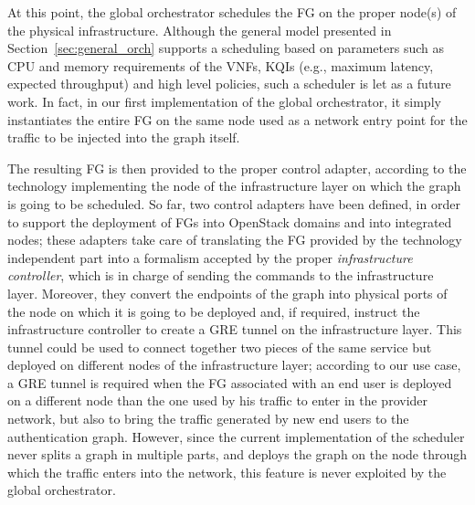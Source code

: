 At this point, the global orchestrator schedules the FG on the proper node(s) of the physical infrastructure.
Although the general model presented in Section~\ref{sec:general_orch} supports a scheduling based on parameters such as CPU and memory requirements of the VNFs, KQIs (e.g., maximum latency, expected throughput) and high level policies, such a scheduler is let as a future work.
In fact, in our first implementation of the global orchestrator, it simply instantiates the entire FG on the same node used as a network entry point for the traffic to be injected into the graph itself.

The resulting FG is then provided to the proper control adapter, according to the technology implementing the node of the infrastructure layer on which the graph is going to be scheduled.
So far, two control adapters have been defined, in order to support the deployment of FGs into OpenStack domains and into integrated nodes; these adapters take care of translating the FG provided by the technology independent part into a formalism accepted by the proper \textit{infrastructure controller}, which is in charge of sending the commands to the infrastructure layer.
Moreover, they convert the endpoints of the graph into physical ports of the node on which it is going to be deployed and, if required, instruct the infrastructure controller to create a GRE tunnel on the infrastructure layer.
This tunnel could be used to connect together two pieces of the same service but deployed on different nodes of the infrastructure layer; %
according to our use case, a GRE tunnel is required when the FG associated with an end user is deployed on a different node than the one used by his traffic to enter in the provider network, but also to bring the traffic generated by new end users to the authentication graph.
However, since the current implementation of the scheduler never splits a graph in multiple parts, and deploys the graph on the node through which the traffic enters into the network, this feature is never exploited by the global orchestrator.

